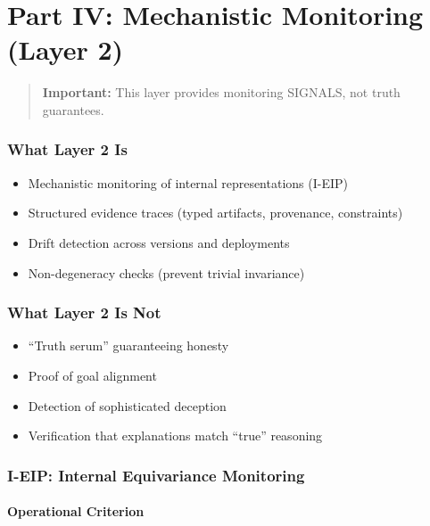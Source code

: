 \documentclass[11pt,letterpaper]{article}
\theoremstyle{definition}
\theoremstyle{remark}
\begin{document}

\part*{Part IV: Mechanistic Monitoring (Layer 2)}

\begin{quote}
\textbf{Important:} This layer provides monitoring SIGNALS, not truth guarantees.
\end{quote}

\section{What Layer 2 Is}

\begin{itemize}
\item Mechanistic monitoring of internal representations (I-EIP)
\item Structured evidence traces (typed artifacts, provenance, constraints)
\item Drift detection across versions and deployments
\item Non-degeneracy checks (prevent trivial invariance)
\end{itemize}

\section{What Layer 2 Is Not}

\begin{itemize}
\item ``Truth serum'' guaranteeing honesty
\item Proof of goal alignment
\item Detection of sophisticated deception
\item Verification that explanations match ``true'' reasoning
\end{itemize}

\section{I-EIP: Internal Equivariance Monitoring}

\subsection{Operational Criterion}
\end{document}
